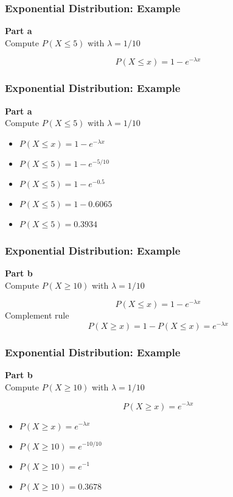 \documentclass{beamer}
\begin{document}
\begin{frame}[fragile]
\frametitle{Exponential Distribution: Example}
\vspace{-2.5cm}
\Large
\textbf{Part a}\\
Compute $P(X \leq 5)$ with $\lambda = 1/10$

\[ P(X \leq x) = 1-e^{-\lambda x} \]
\end{frame}

\begin{frame}[fragile]
\frametitle{Exponential Distribution: Example}
\Large
\vspace{-1cm}
\textbf{Part a}\\
Compute $P(X \leq 5)$ with $\lambda = 1/10$

\begin{itemize}
\item $ P(X \leq x) = 1-e^{-\lambda x} $
\item $ P(X \leq 5) = 1-e^{-5/10}  $
\item $ P(X \leq 5) = 1-e^{-0.5} $
\item $ P(X \leq 5) = 1-0.6065 $
\item $ P(X \leq 5) = 0.3934 $
\end{itemize} 

\end{frame}




\begin{frame}[fragile]
\frametitle{Exponential Distribution: Example}
\vspace{-2.5cm}
\Large
\textbf{Part b}\\
Compute $P(X \geq 10)$ with $\lambda = 1/10$

\[ P(X \leq x) = 1-e^{-\lambda x} \]
Complement rule
\[ P(X \geq x) = 1- P(X \leq x) =  e^{-\lambda x} \]


\end{frame}

\begin{frame}[fragile]
\frametitle{Exponential Distribution: Example}
\vspace{-1.5cm}
\Large
\textbf{Part b}\\
Compute $P(X \geq 10)$ with $\lambda = 1/10$

\[ P(X \geq x) = e^{-\lambda x} \]

\begin{itemize}
\item $ P(X \geq x) = e^{-\lambda x} $
\item $ P(X \geq 10) = e^{-10/10}  $
\item $ P(X \geq 10) = e^{-1} $
\item $ P(X \geq 10) =  0.3678 $
\end{itemize} 
\end{frame}
\end{document}
